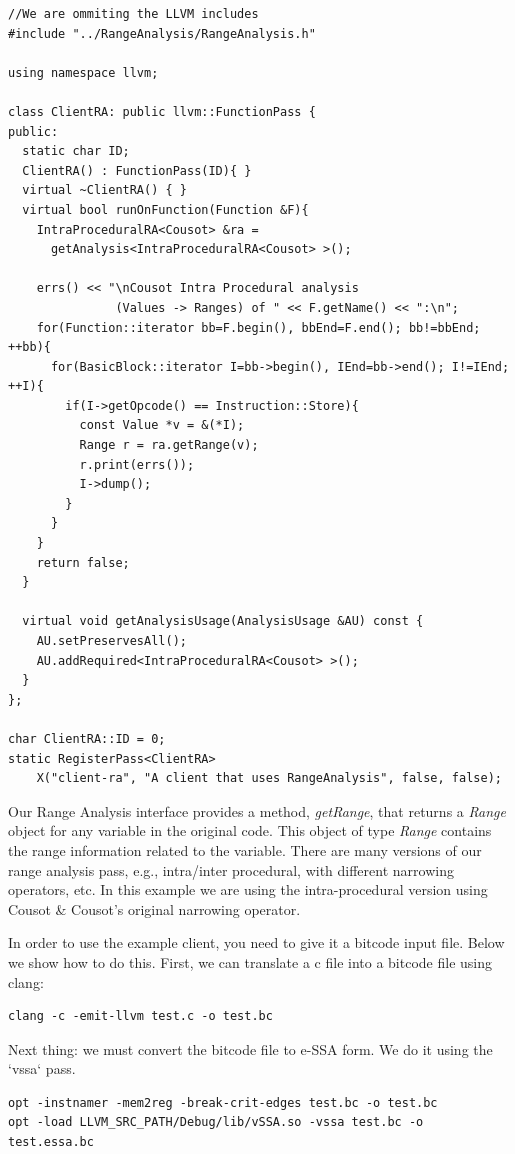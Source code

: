 \documentclass{paper}
\begin{document}
\begin{lstlisting}[frame=single]
//We are ommiting the LLVM includes
#include "../RangeAnalysis/RangeAnalysis.h"

using namespace llvm;

class ClientRA: public llvm::FunctionPass {
public:
  static char ID;
  ClientRA() : FunctionPass(ID){ }
  virtual ~ClientRA() { }
  virtual bool runOnFunction(Function &F){
    IntraProceduralRA<Cousot> &ra = 
      getAnalysis<IntraProceduralRA<Cousot> >();

    errs() << "\nCousot Intra Procedural analysis 
               (Values -> Ranges) of " << F.getName() << ":\n";
    for(Function::iterator bb=F.begin(), bbEnd=F.end(); bb!=bbEnd; ++bb){
      for(BasicBlock::iterator I=bb->begin(), IEnd=bb->end(); I!=IEnd; ++I){
        if(I->getOpcode() == Instruction::Store){
          const Value *v = &(*I);
          Range r = ra.getRange(v);
          r.print(errs());
          I->dump();
        }
      }
    }
    return false;
  }

  virtual void getAnalysisUsage(AnalysisUsage &AU) const {
    AU.setPreservesAll();
    AU.addRequired<IntraProceduralRA<Cousot> >();
  }
};

char ClientRA::ID = 0;
static RegisterPass<ClientRA> 
	X("client-ra", "A client that uses RangeAnalysis", false, false);
\end{lstlisting}

Our Range Analysis interface provides a method, \textit{getRange}, that returns a \textit{Range} object for any variable in the original code. This object of type \textit{Range} contains the range information related to the variable. There are many versions of our range analysis pass, e.g., intra/inter procedural, with different narrowing operators, etc. In this example we are using the intra-procedural version using Cousot & Cousot's original narrowing operator.

In order to use the example client, you need to give it a bitcode input file. Below we show how to do this.
First, we can translate a c file into a bitcode file using clang:
\begin{lstlisting}[frame=single]
clang -c -emit-llvm test.c -o test.bc
\end{lstlisting}

Next thing: we must convert the bitcode file to e-SSA form. We do it using the `vssa` pass.
\begin{lstlisting}[frame=single]
opt -instnamer -mem2reg -break-crit-edges test.bc -o test.bc
opt -load LLVM_SRC_PATH/Debug/lib/vSSA.so -vssa test.bc -o test.essa.bc
\end{lstlisting}
\end{document}
